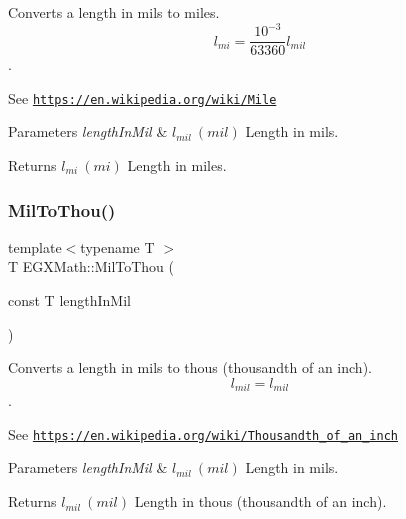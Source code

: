 Converts a length in mils to miles. \[ l_{mi}=\frac{10^{-3}}{63360} l_{mil} \]. 

See \href{https://en.wikipedia.org/wiki/Mile}{\tt https\+://en.\+wikipedia.\+org/wiki/\+Mile} 
\begin{DoxyParams}{Parameters}
{\em length\+In\+Mil} & $ l_{mil}\ (mil)$ Length in mils. \\
\hline
\end{DoxyParams}
\begin{DoxyReturn}{Returns}
$ l_{mi}\ (mi)$ Length in miles. 
\end{DoxyReturn}
\mbox{\label{group___e_g_x_math-_conversions-_length_conversions-_imperial-_mil-_imperial_gad56400e34744827dbf9b886f6261c0de}} 
\subsubsection{\texorpdfstring{Mil\+To\+Thou()}{MilToThou()}}
{\footnotesize\ttfamily template$<$typename T $>$ \\
T E\+G\+X\+Math\+::\+Mil\+To\+Thou (\begin{DoxyParamCaption}\item[{const T}]{length\+In\+Mil }\end{DoxyParamCaption})}



Converts a length in mils to thous (thousandth of an inch). \[ l_{mil}= l_{mil} \]. 

See \href{https://en.wikipedia.org/wiki/Thousandth_of_an_inch}{\tt https\+://en.\+wikipedia.\+org/wiki/\+Thousandth\+\_\+of\+\_\+an\+\_\+inch} 
\begin{DoxyParams}{Parameters}
{\em length\+In\+Mil} & $ l_{mil}\ (mil)$ Length in mils. \\
\hline
\end{DoxyParams}
\begin{DoxyReturn}{Returns}
$ l_{mil}\ (mil)$ Length in thous (thousandth of an inch). 
\end{DoxyReturn}
\mbox{\label{group___e_g_x_math-_conversions-_length_conversions-_imperial-_mil-_imperial_gade02edc43d3b604eead1bd825063df51}} 
